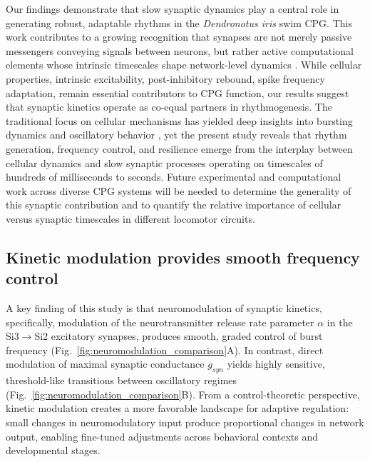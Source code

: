 \documentclass[nofootinbib,aip,amsmath,amssymb,preprint,twocolumn,floatfix,10pt]{revtex4-2}
\begin{document}
Our findings demonstrate that slow synaptic dynamics play a central role in generating robust, adaptable rhythms in the \textit{Dendronotus iris} swim CPG. This work contributes to a growing recognition that synapses are not merely passive messengers conveying signals between neurons, but rather active computational elements whose intrinsic timescales shape network-level dynamics \cite{zucker2002short, Manor1997, NadimBucher2014}. While cellular properties, intrinsic excitability, post-inhibitory rebound, spike frequency adaptation, remain essential contributors to CPG function, our results suggest that synaptic kinetics operate as co-equal partners in rhythmogenesis. The traditional focus on cellular mechanisms has yielded deep insights into bursting dynamics and oscillatory behavior \cite{Rinzel87b, plant81}, yet the present study reveals that rhythm generation, frequency control, and resilience emerge from the interplay between cellular dynamics and slow synaptic processes operating on timescales of hundreds of milliseconds to seconds. Future experimental and computational work across diverse CPG systems will be needed to determine the generality of this synaptic contribution and to quantify the relative importance of cellular versus synaptic timescales in different locomotor circuits.

\subsection{Kinetic modulation provides smooth frequency control}

A key finding of this study is that neuromodulation of synaptic kinetics, specifically, modulation of the neurotransmitter release rate parameter $\alpha$ in the Si3$\to$Si2 excitatory synapses, produces smooth, graded control of burst frequency (Fig.~\ref{fig:neuromodulation_comparison}A). In contrast, direct modulation of maximal synaptic conductance $g_{syn}$ yields highly sensitive, threshold-like transitions between oscillatory regimes (Fig.~\ref{fig:neuromodulation_comparison}B). From a control-theoretic perspective, kinetic modulation creates a more favorable landscape for adaptive regulation: small changes in neuromodulatory input produce proportional changes in network output, enabling fine-tuned adjustments across behavioral contexts and developmental stages.
\end{document}
